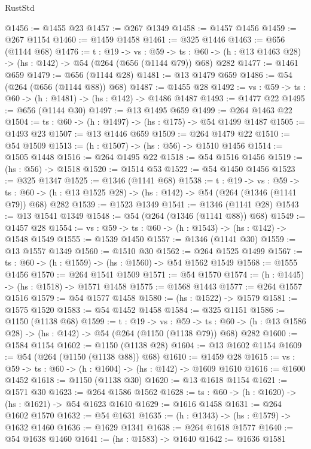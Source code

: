 \begin{lexlean}{RustStd}
\begin{coremodule}
@1456 := @1455 @23
@1457 := @267 @1349
@1458 := @1457 @1456
@1459 := @267 @1154
@1460 := @1459 @1458
@1461 := @325 @1446
@1463 := @656 (@1144 @68)
@1476 := {t : @19} ->
  {vs : @59} ->
  {ts : @60} -> (h : @13 @1463 @28) -> (hs : @142) -> @54 (@264 (@656 (@1144 @79)) @68) @282
@1477 := @1461 @659
@1479 := @656 (@1144 @28)
@1481 := @13 @1479 @659
@1486 := @54 (@264 (@656 (@1144 @88)) @68)
@1487 := @1455 @28
@1492 := {vs : @59} -> {ts : @60} -> (h : @1481) -> (hs : @142) -> @1486 @1487
@1493 := @1477 @22
@1495 := @656 (@1144 @30)
@1497 := @13 @1495 @659
@1499 := @264 @1463 @22
@1504 := {ts : @60} -> (h : @1497) -> (hs : @175) -> @54 @1499 @1487
@1505 := @1493 @23
@1507 := @13 @1446 @659
@1509 := @264 @1479 @22
@1510 := @54 @1509
@1513 := (h : @1507) -> (hs : @56) -> @1510 @1456
@1514 := @1505 @1448
@1516 := @264 @1495 @22
@1518 := @54 @1516 @1456
@1519 := (hs : @56) -> @1518
@1520 := @1514 @53
@1522 := @54 @1450 @1456
@1523 := @325 @1347
@1525 := @1346 (@1141 @68)
@1538 := {t : @19} ->
  {vs : @59} ->
  {ts : @60} -> (h : @13 @1525 @28) -> (hs : @142) -> @54 (@264 (@1346 (@1141 @79)) @68) @282
@1539 := @1523 @1349
@1541 := @1346 (@1141 @28)
@1543 := @13 @1541 @1349
@1548 := @54 (@264 (@1346 (@1141 @88)) @68)
@1549 := @1457 @28
@1554 := {vs : @59} -> {ts : @60} -> (h : @1543) -> (hs : @142) -> @1548 @1549
@1555 := @1539 @1450
@1557 := @1346 (@1141 @30)
@1559 := @13 @1557 @1349
@1560 := @1510 @30
@1562 := @264 @1525 @1499
@1567 := {ts : @60} -> (h : @1559) -> (hs : @1560) -> @54 @1562 @1549
@1568 := @1555 @1456
@1570 := @264 @1541 @1509
@1571 := @54 @1570
@1574 := (h : @1445) -> (hs : @1518) -> @1571 @1458
@1575 := @1568 @1443
@1577 := @264 @1557 @1516
@1579 := @54 @1577 @1458
@1580 := (hs : @1522) -> @1579
@1581 := @1575 @1520
@1583 := @54 @1452 @1458
@1584 := @325 @1151
@1586 := @1150 (@1138 @68)
@1599 := {t : @19} ->
  {vs : @59} ->
  {ts : @60} -> (h : @13 @1586 @28) -> (hs : @142) -> @54 (@264 (@1150 (@1138 @79)) @68) @282
@1600 := @1584 @1154
@1602 := @1150 (@1138 @28)
@1604 := @13 @1602 @1154
@1609 := @54 (@264 (@1150 (@1138 @88)) @68)
@1610 := @1459 @28
@1615 := {vs : @59} -> {ts : @60} -> (h : @1604) -> (hs : @142) -> @1609 @1610
@1616 := @1600 @1452
@1618 := @1150 (@1138 @30)
@1620 := @13 @1618 @1154
@1621 := @1571 @30
@1623 := @264 @1586 @1562
@1628 := {ts : @60} -> (h : @1620) -> (hs : @1621) -> @54 @1623 @1610
@1629 := @1616 @1458
@1631 := @264 @1602 @1570
@1632 := @54 @1631
@1635 := (h : @1343) -> (hs : @1579) -> @1632 @1460
@1636 := @1629 @1341
@1638 := @264 @1618 @1577
@1640 := @54 @1638 @1460
@1641 := (hs : @1583) -> @1640
@1642 := @1636 @1581

\end{coremodule}
\end{lexlean}

